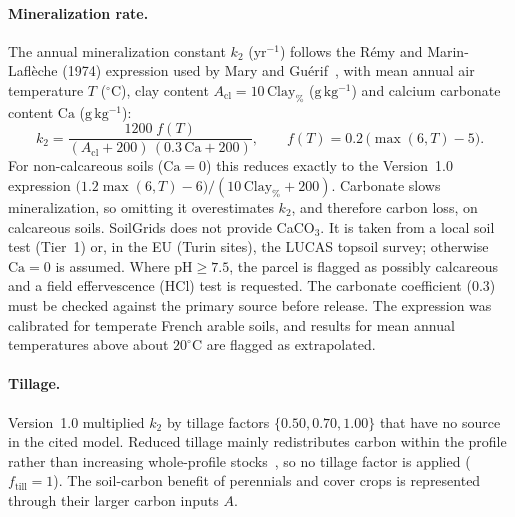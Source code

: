 \paragraph{Mineralization rate.} The annual mineralization constant $k_2$ ($\mathrm{yr^{-1}}$) follows the R{\'e}my and Marin-Lafl{\`e}che (1974) expression used by Mary and Gu{\'e}rif~\cite{mary1994soil}, with mean annual air temperature $T$ ($^{\circ}\mathrm{C}$), clay content $A_{\mathrm{cl}} = 10\,\mathrm{Clay}_{\%}$ ($\mathrm{g\,kg^{-1}}$) and calcium carbonate content $\mathrm{Ca}$ ($\mathrm{g\,kg^{-1}}$):
\begin{equation}
  k_2 = \frac{1200 \; f(T)}{(A_{\mathrm{cl}} + 200)\,(0.3\,\mathrm{Ca} + 200)}, \qquad f(T) = 0.2\,\bigl(\max(6, T) - 5\bigr).
\end{equation}
For non-calcareous soils ($\mathrm{Ca} = 0$) this reduces exactly to the Version~1.0 expression $\bigl(1.2\max(6,T) - 6\bigr)/(10\,\mathrm{Clay}_{\%} + 200)$. Carbonate slows mineralization, so omitting it overestimates $k_2$, and therefore carbon loss, on calcareous soils. SoilGrids does not provide CaCO$_3$. It is taken from a local soil test (Tier~1) or, in the EU (Turin sites), the LUCAS topsoil survey; otherwise $\mathrm{Ca} = 0$ is assumed. Where $\mathrm{pH} \ge 7.5$, the parcel is flagged as possibly calcareous and a field effervescence (HCl) test is requested. The carbonate coefficient ($0.3$) must be checked against the primary source before release. The expression was calibrated for temperate French arable soils, and results for mean annual temperatures above about $20^{\circ}\mathrm{C}$ are flagged as extrapolated.

\paragraph{Tillage.} Version~1.0 multiplied $k_2$ by tillage factors $\{0.50, 0.70, 1.00\}$ that have no source in the cited model. Reduced tillage mainly redistributes carbon within the profile rather than increasing whole-profile stocks~\cite{powlson2014limited}, so no tillage factor is applied ($f_{\mathrm{till}} = 1$). The soil-carbon benefit of perennials and cover crops is represented through their larger carbon inputs $A$.

